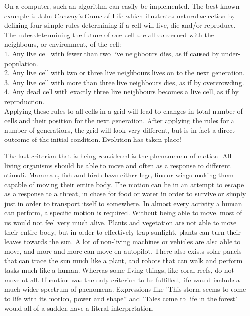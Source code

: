 On a computer, such an algorithm can easily be implemented. The best known example is John Conway's Game of Life \cite{Conway} which illustrates natural selection by defining four simple rules determining if a cell will live, die and/or reproduce. The rules determining the future of one cell are all concerned with the neighbours, or environment, of the cell: \\
1. Any live cell with fewer than two live neighbours dies, as if caused by under-population. \\
2. Any live cell with two or three live neighbours lives on to the next generation. \\
3. Any live cell with more than three live neighbours dies, as if by overcrowding. \\
4. Any dead cell with exactly three live neighbours becomes a live cell, as if by reproduction. \\
Applying these rules to all cells in a grid will lead to changes in total number of cells and their position for the next generation. After applying the rules for a number of generations, the grid will look very different, but is in fact a direct outcome of the initial condition. Evolution has taken place!

The last criterion that is being considered is the phenomenon of motion. All living organisms should be able to move and often as a response to different stimuli. Mammals, fish and birds have either legs, fins or wings making them capable of moving their entire body. The motion can be in an attempt to escape as a response to a threat, in chase for food or water in order to survive or simply just in order to transport itself to somewhere. In almost every activity a human can perform, a specific motion is required. Without being able to move, most of us would not feel very much alive. Plants and vegetation are not able to move their entire body, but in order to effectively trap sunlight, plants can turn their leaves towards the sun. A lot of non-living machines or vehicles are also able to move, and more and more can move on autopilot. There also exists solar panels that can trace the sun much like a plant, and robots that can walk and perform tasks much like a human. Whereas some living things, like coral reefs, do not move at all. If motion was the only criterion to be fulfilled, life would include a much wider spectrum of phenomena. Expressions like "This storm seems to come to life with its motion, power and shape'' and "Tales come to life in the forest" would all of a sudden have a literal interpretation. 

